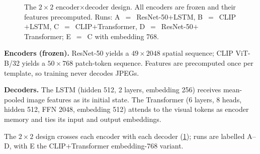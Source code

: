 \documentclass{article}
\theoremstyle{plain}
\theoremstyle{definition}
\theoremstyle{remark}
\begin{document}
\begin{figure}[!tb]
\centering
{}
\caption{The $2\times2$ encoder$\times$decoder design. All encoders are frozen
and their features precomputed. Runs: A~$=$~ResNet-50$+$LSTM,
B~$=$~CLIP$+$LSTM, C~$=$~CLIP$+$Transformer,
D~$=$~ResNet-50$+$Transformer; E~$=$~C with embedding 768.}
\label{fig:arch}
\end{figure}

\textbf{Encoders (frozen).} ResNet-50 \citep{he2016deep} yields a $49\times2048$
spatial sequence; CLIP ViT-B/32 \citep{radford2021learning} yields a
$50\times768$ patch-token sequence. Features are precomputed once per template,
so training never decodes JPEGs.

\textbf{Decoders.} The LSTM \citep{hochreiter1997long} (hidden 512, 2 layers,
embedding 256) receives mean-pooled image features as its initial state. The
Transformer \citep{vaswani2017attention} (6 layers, 8 heads, hidden 512, FFN
2048, embedding 512) attends to the visual tokens as encoder memory and ties
its input and output embeddings.

The $2\times2$ design crosses each encoder with each decoder
(\cref{fig:arch}); runs are labelled A--D, with E the CLIP$+$Transformer
embedding-768 variant.
\end{document}
